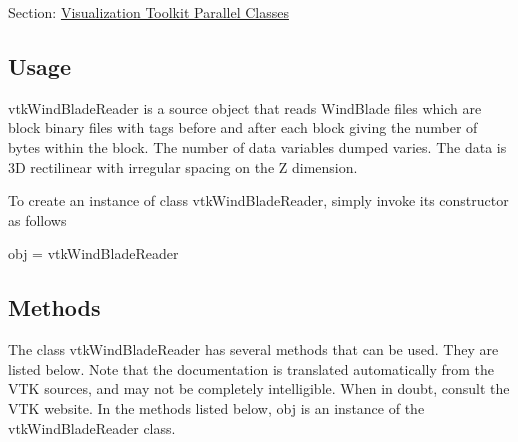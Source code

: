 Section\-: \hyperlink{sec_vtkparallel}{Visualization Toolkit Parallel Classes} \hypertarget{vtkwidgets_vtkxyplotwidget_Usage}{}\subsection{Usage}\label{vtkwidgets_vtkxyplotwidget_Usage}
vtk\-Wind\-Blade\-Reader is a source object that reads Wind\-Blade files which are block binary files with tags before and after each block giving the number of bytes within the block. The number of data variables dumped varies. The data is 3\-D rectilinear with irregular spacing on the Z dimension.

To create an instance of class vtk\-Wind\-Blade\-Reader, simply invoke its constructor as follows \begin{DoxyVerb}  obj = vtkWindBladeReader
\end{DoxyVerb}
 \hypertarget{vtkwidgets_vtkxyplotwidget_Methods}{}\subsection{Methods}\label{vtkwidgets_vtkxyplotwidget_Methods}
The class vtk\-Wind\-Blade\-Reader has several methods that can be used. They are listed below. Note that the documentation is translated automatically from the V\-T\-K sources, and may not be completely intelligible. When in doubt, consult the V\-T\-K website. In the methods listed below, {\ttfamily obj} is an instance of the vtk\-Wind\-Blade\-Reader class. 
